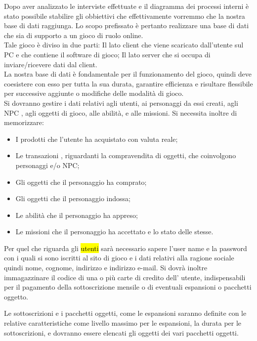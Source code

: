 
Dopo aver analizzato le interviste effettuate e il diagramma  dei processi interni è stato possibile stabilire gli obbiettivi che  effettivamente vorremmo che la nostra base di dati raggiunga.
Lo scopo prefissato è pertanto realizzare una base di dati che sia di supporto a un gioco di ruolo online.
\\
Tale gioco è diviso in due parti: 
Il lato client che viene scaricato dall'utente sul PC e  che contiene il software di gioco; 
Il lato server  che si occupa di inviare/ricevere dati dal client. 
\\
La nostra base di dati è fondamentale per il funzionamento del gioco, quindi deve coesistere con esso per tutta la sua durata, garantire efficienza e risultare flessibile per successive aggiunte o modifiche delle modalità di gioco.
\\
Si dovranno gestire i dati relativi agli utenti, ai personaggi da essi creati, agli NPC , agli oggetti di gioco, alle abilità, e alle missioni.
Si necessita inoltre di memorizzare:

\begin{itemize}
\item	I prodotti che l'utente ha acquistato con valuta reale; 
\item	Le transazioni , riguardanti la compravendita di oggetti, che coinvolgono personaggi e/o NPC;
\item	Gli oggetti che il personaggio ha comprato;
\item	Gli oggetti che il personaggio indossa;
\item	Le abilità che il personaggio ha appreso;
\item	Le missioni che il personaggio ha accettato e lo stato delle stesse.
\end{itemize}

Per quel che riguarda gli \hl{utenti} sar\`{a} necessario sapere  l'user name e la password con i quali si sono iscritti al sito di gioco e i  dati relativi alla ragione sociale quindi nome, cognome, indirizzo e indirizzo e-mail. Si dovr\`{a} inoltre immagazzinare il codice di una o pi\`{u} carte di credito dell' utente, indispensabili per il  pagamento della sottoscrizione mensile o di eventuali espansioni o pacchetti oggetto.

Le sottoscrizioni e i pacchetti oggetti, come le espansioni saranno definite con le relative caratteristiche come livello massimo per le espansioni, la durata per le sottoscrizioni, e dovranno essere elencati gli oggetti dei vari pacchetti oggetti.\\

